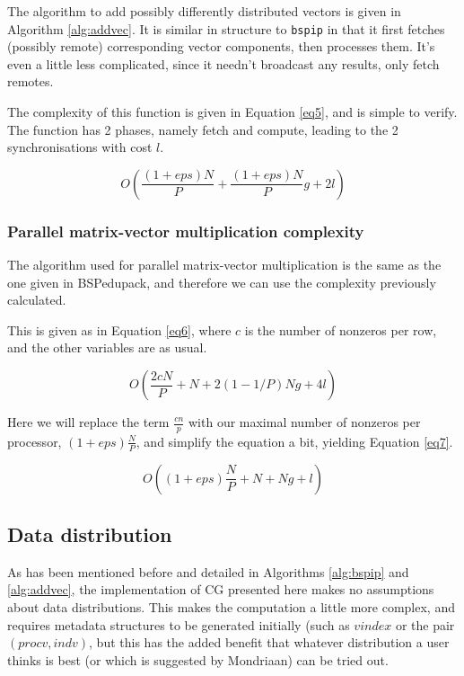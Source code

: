 \documentclass[a4paper]{article}
\begin{document}
The algorithm to add possibly differently distributed vectors
is given in Algorithm \ref{alg:addvec}. It is similar in structure to
\texttt{bspip} in that it first fetches (possibly remote) corresponding
vector components, then processes them. It's even a little less complicated,
since it needn't broadcast any results, only fetch remotes.

The complexity of this function is given in Equation \ref{eq5}, and
is simple to verify. The function has 2 phases, namely fetch and compute, leading to the 2 synchronisations with cost $l$.

\begin{equation}
    O\left( \frac{(1+eps)N}{P}  + \frac{(1+eps)N}{P} g + 2l\right)
    \label{eq5}
\end{equation}
\subsubsection{Parallel matrix-vector multiplication complexity}

The algorithm used for parallel matrix-vector multiplication is
the same as the one given in BSPedupack, and therefore we can
use the complexity previously calculated\cite{bisseling2004parallel}.

This is given as in Equation \ref{eq6}, where $c$ is the number of
nonzeros per row, and the other variables are as usual.

\begin{equation}
    O\left(\frac{2cN}{P} + N + 2(1-1/P)Ng + 4l\right)
    \label{eq6}
\end{equation}

Here we will replace the term $\frac{cn}{p}$ with our maximal number of
nonzeros per processor, $(1+eps) \frac{N}{P}$, and simplify the equation
a bit, yielding Equation \ref{eq7}.

\begin{equation}
    O\left( (1+eps)\frac{N}{P}  + N + Ng + l  \right)
    \label{eq7}
\end{equation}


\subsection{Data distribution}\label{sec:data-distribition}

As has been mentioned before and detailed in Algorithms \ref{alg:bspip} and \ref{alg:addvec}, the
implementation of CG presented here makes no assumptions about data distributions. This makes
the computation a little more complex, and requires metadata structures to be generated initially
(such as $vindex$ or the pair $(procv,indv)$, but this has the added benefit that whatever
distribution a user thinks is best (or which is suggested by Mondriaan) can be tried out.
\end{document}
